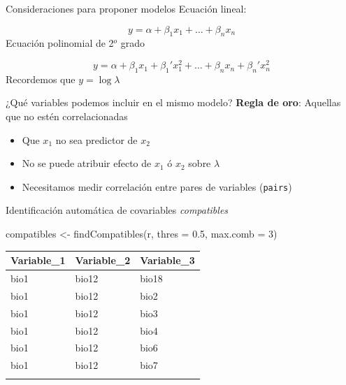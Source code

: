 \documentclass[
  11pt,
  ignorenonframetext,
]{beamer}
\newenvironment{Shaded}{}{}
\newcommand{\AttributeTok}[1]{\textcolor[rgb]{0.49,0.56,0.16}{#1}}
\newcommand{\DecValTok}[1]{\textcolor[rgb]{0.25,0.63,0.44}{#1}}
\newcommand{\FloatTok}[1]{\textcolor[rgb]{0.25,0.63,0.44}{#1}}
\newcommand{\FunctionTok}[1]{\textcolor[rgb]{0.02,0.16,0.49}{#1}}
\newcommand{\NormalTok}[1]{#1}
\newcommand{\OtherTok}[1]{\textcolor[rgb]{0.00,0.44,0.13}{#1}}
\providecommand{\tightlist}{%
  \setlength{\itemsep}{0pt}\setlength{\parskip}{0pt}}
\begin{document}
\begin{frame}{Consideraciones para proponer modelos}
\protect\hypertarget{consideraciones-para-proponer-modelos-1}{}
Ecuación lineal:

\[ y = \alpha + \beta_1 x_1 + \dots + \beta_n x_n\] Ecuación polinomial
de 2\(^o\) grado

\[ y = \alpha + \beta_1 x_1 + \beta_1' x_1^2 + \dots + \beta_n x_n + \beta_n' x_n^2\]
Recordemos que \(y = \log \lambda\)
\end{frame}

\begin{frame}[fragile]{¿Qué variables podemos incluir en el mismo
modelo?}
\protect\hypertarget{quuxe9-variables-podemos-incluir-en-el-mismo-modelo}{}
\textbf{Regla de oro}: Aquellas que no estén correlacionadas

\begin{itemize}
\tightlist
\item
  Que \(x_1\) no sea predictor de \(x_2\)
\item
  No se puede atribuir efecto de \(x_1\) ó \(x_2\) sobre \(\lambda\)
\item
  Necesitamos medir correlación entre pares de variables
  (\texttt{pairs})
\end{itemize}
\end{frame}

\begin{frame}[fragile]{Identificación automática de covariables
\emph{compatibles}}
\protect\hypertarget{identificaciuxf3n-automuxe1tica-de-covariables-compatibles}{}
\begin{Shaded}
\begin{Highlighting}[]
\NormalTok{compatibles }\OtherTok{\textless{}{-}} \FunctionTok{findCompatibles}\NormalTok{(r, }\AttributeTok{thres =} \FloatTok{0.5}\NormalTok{, }
                               \AttributeTok{max.comb =} \DecValTok{3}\NormalTok{)}
\end{Highlighting}
\end{Shaded}

\begin{longtable}[]{@{}lll@{}}
\toprule\noalign{}
Variable\_1 & Variable\_2 & Variable\_3 \\
\midrule\noalign{}
\endhead
bio1 & bio12 & bio18 \\
bio1 & bio12 & bio2 \\
bio1 & bio12 & bio3 \\
bio1 & bio12 & bio4 \\
bio1 & bio12 & bio6 \\
bio1 & bio12 & bio7 \\
\bottomrule\noalign{}
\end{longtable}
\end{frame}
\end{document}
